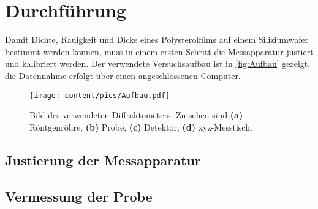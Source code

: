 \section{Durchführung}
\label{sec:Durchführung}
Damit Dichte, Rauigkeit und Dicke eines Polysterolfilms auf einem Siliziumwafer bestimmt werden können, muss in einem ersten Schritt die Messapparatur
justiert und kalibriert werden.
Der verwendete Versuchsaufbau ist in \autoref{fig:Aufbau} gezeigt, die Datennahme erfolgt über einen angeschlossenen Computer.

\begin{figure}
    \centering
    \texttt{[image: content/pics/Aufbau.pdf]}
    \caption{Bild des verwendeten Diffraktometers. Zu sehen sind \textbf{(a)} Röntgenröhre, \textbf{(b)} Probe, \textbf{(c)} Detektor, \textbf{(d)} xyz-Messtisch.}
    \label{fig:Aufbau}
\end{figure}

\subsection{Justierung der Messapparatur}

\subsection{Vermessung der Probe}